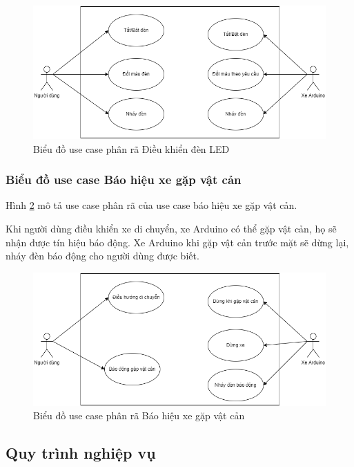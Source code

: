 \documentclass[../DoAn.tex]{subfiles}
\begin{document}
\begin{figure}[H]
    \includegraphics[scale = 0.6]{Hinhve/usecase_phan_ra_dieu_khien_den.png}
    \centering
    \caption{Biểu đồ use case phân rã Điều khiển đèn LED}
    \label{fig:2.2.2.2}
\end{figure}

\subsubsection{Biểu đồ use case Báo hiệu xe gặp vật cản}
\label{subsection:2.2.2.3}

Hình \ref{fig:2.2.2.3} mô tả use case phân rã của use case báo hiệu xe gặp vật cản.

Khi người dùng điều khiển xe di chuyển, xe Arduino có thể gặp vật cản, họ sẽ nhận được tín hiệu báo động. Xe Arduino khi gặp vật cản trước mặt sẽ dừng lại, nháy đèn báo động cho người dùng được biết.

\begin{figure}[H]
    \includegraphics[scale = 0.6]{Hinhve/usecase_phan_ra_cam_bien_khoang_cach.png}
    \centering
    \caption{Biểu đồ use case phân rã Báo hiệu xe gặp vật cản}
    \label{fig:2.2.2.3}
\end{figure}

\subsection{Quy trình nghiệp vụ}
\label{subsection:2.2.3}
\end{document}
